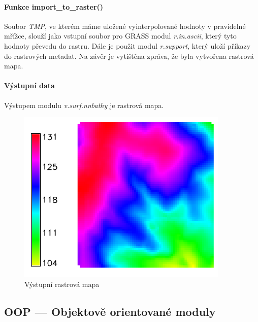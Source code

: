\documentclass[12pt,a4paper]{article}
\begin{document}
\paragraph{Funkce import\_to\_raster()}

Soubor \emph{TMP}, ve kterém máme uložené vyinterpolované hodnoty v
pravidelné mřížce, slouží jako vstupní soubor pro GRASS modul
\emph{r.in.ascii}, který tyto hodnoty převedu do rastru. Dále je
použit modul \emph{r.support}, který uloží příkazy do rastrových
metadat. Na závěr je vytištěna zpráva, že byla vytvořena rastrová
mapa.

\paragraph{Výstupní data}
Výstupem modulu \emph{v.surf.nnbathy} je rastrová mapa.

\begin{figure}[h!]
\centering
\includegraphics[width=0.9\textwidth]{img/vystup_rast_map.png}
\caption{Výstupní rastrová mapa}
\label{fig:vystup_rast_map}
\end{figure}

\newpage
\subsection{OOP --- Objektově orientované moduly}
\end{document}
